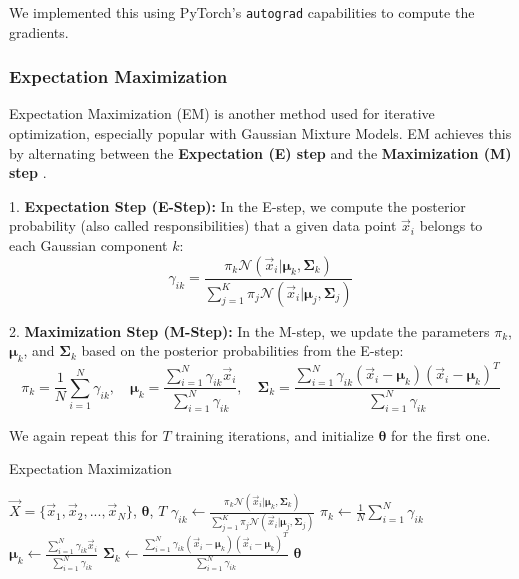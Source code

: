 We implemented this using PyTorch's \cite{pytorch} \texttt{autograd} capabilities to compute the gradients.

\newpage
\subsubsection{Expectation Maximization}
\label{sec:gmm_em}

Expectation Maximization (EM) is another method used for iterative optimization, especially popular with Gaussian Mixture Models. EM achieves this by alternating between the \textbf{Expectation (E) step} and the \textbf{Maximization (M) step} \cite{ml_book}.

1. \textbf{Expectation Step (E-Step):} In the E-step, we compute the posterior probability (also called responsibilities) that a given data point $\vec{x}_i$ belongs to each Gaussian component $k$:
\[
   \gamma_{ik} = \frac{\pi_k \mathcal{N}(\vec{x}_i|\boldsymbol{\mu}_k, \boldsymbol{\Sigma}_k)}{\sum_{j=1}^{K} \pi_j \mathcal{N}(\vec{x}_i|\boldsymbol{\mu}_j, \boldsymbol{\Sigma}_j)}
\]

2. \textbf{Maximization Step (M-Step):} In the M-step, we update the parameters $\pi_k$, $\boldsymbol{\mu}_k$, and $\boldsymbol{\Sigma}_k$ based on the posterior probabilities from the E-step: 
\[
   \pi_k = \frac{1}{N} \sum_{i=1}^{N} \gamma_{ik}, \quad
   \boldsymbol{\mu}_k = \frac{\sum_{i=1}^{N} \gamma_{ik} \vec{x}_i}{\sum_{i=1}^{N} \gamma_{ik}}, \quad
   \boldsymbol{\Sigma}_k = \frac{\sum_{i=1}^{N} \gamma_{ik} (\vec{x}_i - \boldsymbol{\mu}_k)(\vec{x}_i - \boldsymbol{\mu}_k)^T}{\sum_{i=1}^{N} \gamma_{ik}}
\]

We again repeat this for $T$ training iterations, and initialize $\boldsymbol{\theta}$ for the first one.  \\

\begin{algorithm}
    \caption{Expectation Maximization}
    \label{alg:em_gmm}
    \begin{algorithmic}[1]  
        \Require $\vec X = \{\vec x_1, \vec x_2, ..., \vec x_N\}$, $\boldsymbol{\theta}$, $T$
                    \State $\gamma_{ik} \gets \frac{\pi_k \mathcal{N}(\vec{x}_i|\boldsymbol{\mu}_k, \boldsymbol{\Sigma}_k)}{\sum_{j=1}^{K} \pi_j \mathcal{N}(\vec{x}_i|\boldsymbol{\mu}_j, \boldsymbol{\Sigma}_j)}$
                \EndFor
            \EndFor
                \State $\pi_k \gets \frac{1}{N} \sum_{i=1}^{N} \gamma_{ik}$
                \State $\boldsymbol{\mu}_k \gets \frac{\sum_{i=1}^{N} \gamma_{ik} \vec{x}_i}{\sum_{i=1}^{N} \gamma_{ik}}$
                \State $\boldsymbol{\Sigma}_k \gets \frac{\sum_{i=1}^{N} \gamma_{ik} (\vec{x}_i - \boldsymbol{\mu}_k)(\vec{x}_i - \boldsymbol{\mu}_k)^T}{\sum_{i=1}^{N} \gamma_{ik}}$
            \EndFor
        \EndFor
        \State \Return $\boldsymbol{\theta}$
    \end{algorithmic}
\end{algorithm}

